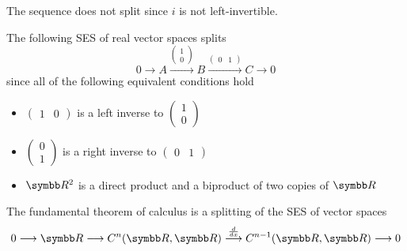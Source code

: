 \begin{example}
\begin{defenum}
    The sequence does not split since \( i \) is not left-invertible.

     The following SES of real vector spaces splits
    \begin{equation*}
      0
      \longrightarrow
      A
      \overset {\left(\begin{smallmatrix}1 \\ 0\end{smallmatrix}\right)} \longrightarrow
      B
      \overset {\left(\begin{smallmatrix}0 & 1\end{smallmatrix}\right)} \longrightarrow
      C
      \longrightarrow
      0
    \end{equation*}
    since all of the following equivalent conditions hold
    \begin{itemize}
      \item \( \left(\begin{smallmatrix}1 & 0\end{smallmatrix}\right) \) is a left inverse to \( \left(\begin{smallmatrix}1 \\ 0\end{smallmatrix}\right) \)
      \item \( \left(\begin{smallmatrix}0 \\ 1\end{smallmatrix}\right) \) is a right inverse to \( \left(\begin{smallmatrix}0 & 1\end{smallmatrix}\right) \)
      \item \( \BR^2 \) is a direct product and a biproduct of two copies of \( \BR \)
    \end{itemize}

     The fundamental theorem of calculus is a splitting of the SES of vector spaces
    \begin{equation*}
      0
      \longrightarrow
      \BR
      \longrightarrow
      C^n(\BR, \BR)
      \overset {\frac d {dx}} \longrightarrow
      C^{n-1}(\BR, \BR)
      \longrightarrow
      0
    \end{equation*}
  \end{defenum}
\end{example}


